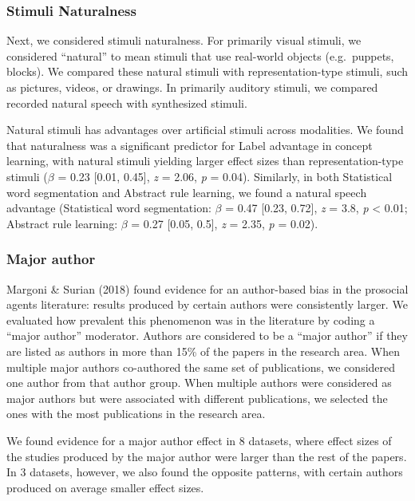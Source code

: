 \documentclass[10pt, letterpaper]{article}
\begin{document}
\hypertarget{stimuli-naturalness}{%
\subsubsection{Stimuli Naturalness}\label{stimuli-naturalness}}

Next, we considered stimuli naturalness. For primarily visual stimuli,
we considered ``natural'' to mean stimuli that use real-world objects
(e.g.~puppets, blocks). We compared these natural stimuli with
representation-type stimuli, such as pictures, videos, or drawings. In
primarily auditory stimuli, we compared recorded natural speech with
synthesized stimuli.

Natural stimuli has advantages over artificial stimuli across
modalities. We found that naturalness was a significant predictor for
Label advantage in concept learning, with natural stimuli yielding
larger effect sizes than representation-type stimuli (\(\beta\) = 0.23
{[}0.01, 0.45{]}, \emph{z} = 2.06, \emph{p} = 0.04). Similarly, in both
Statistical word segmentation and Abstract rule learning, we found a
natural speech advantage (Statistical word segmentation: \(\beta\) =
0.47 {[}0.23, 0.72{]}, \emph{z} = 3.8, \emph{p} \textless{} 0.01;
Abstract rule learning: \(\beta\) = 0.27 {[}0.05, 0.5{]}, \emph{z} =
2.35, \emph{p} = 0.02).

\hypertarget{major-author}{%
\subsubsection{Major author}\label{major-author}}

Margoni \& Surian (2018) found evidence for an author-based bias in the
prosocial agents literature: results produced by certain authors were
consistently larger. We evaluated how prevalent this phenomenon was in
the literature by coding a ``major author'' moderator. Authors are
considered to be a ``major author'' if they are listed as authors in
more than 15\% of the papers in the research area. When multiple major
authors co-authored the same set of publications, we considered one
author from that author group. When multiple authors were considered as
major authors but were associated with different publications, we
selected the ones with the most publications in the research area.

We found evidence for a major author effect in 8 datasets, where effect
sizes of the studies produced by the major author were larger than the
rest of the papers. In 3 datasets, however, we also found the opposite
patterns, with certain authors produced on average smaller effect sizes.
\end{document}
